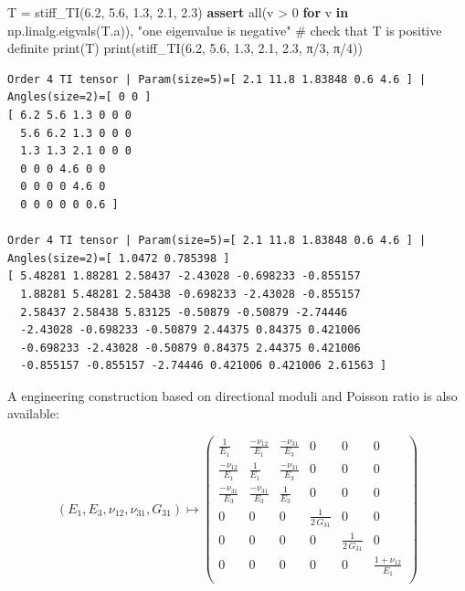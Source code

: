 \documentclass[
  letterpaper,
  DIV=11,
  numbers=noendperiod]{scrreprt}
\newenvironment{Shaded}{\begin{snugshade}}{\end{snugshade}}
\newcommand{\BuiltInTok}[1]{\textcolor[rgb]{0.00,0.23,0.31}{#1}}
\newcommand{\CommentTok}[1]{\textcolor[rgb]{0.37,0.37,0.37}{#1}}
\newcommand{\ControlFlowTok}[1]{\textcolor[rgb]{0.00,0.23,0.31}{\textbf{#1}}}
\newcommand{\DecValTok}[1]{\textcolor[rgb]{0.68,0.00,0.00}{#1}}
\newcommand{\FloatTok}[1]{\textcolor[rgb]{0.68,0.00,0.00}{#1}}
\newcommand{\KeywordTok}[1]{\textcolor[rgb]{0.00,0.23,0.31}{\textbf{#1}}}
\newcommand{\NormalTok}[1]{\textcolor[rgb]{0.00,0.23,0.31}{#1}}
\newcommand{\OperatorTok}[1]{\textcolor[rgb]{0.37,0.37,0.37}{#1}}
\newcommand{\StringTok}[1]{\textcolor[rgb]{0.13,0.47,0.30}{#1}}
\begin{document}
\begin{Shaded}
\begin{Highlighting}[]
\NormalTok{T }\OperatorTok{=}\NormalTok{ stiff\_TI(}\FloatTok{6.2}\NormalTok{, }\FloatTok{5.6}\NormalTok{, }\FloatTok{1.3}\NormalTok{, }\FloatTok{2.1}\NormalTok{, }\FloatTok{2.3}\NormalTok{)}
\ControlFlowTok{assert} \BuiltInTok{all}\NormalTok{(v }\OperatorTok{\textgreater{}} \DecValTok{0} \ControlFlowTok{for}\NormalTok{ v }\KeywordTok{in}\NormalTok{ np.linalg.eigvals(T.a)), }\StringTok{"one eigenvalue is negative"}
\CommentTok{\# check that T is positive definite}
\BuiltInTok{print}\NormalTok{(T)}
\BuiltInTok{print}\NormalTok{(stiff\_TI(}\FloatTok{6.2}\NormalTok{, }\FloatTok{5.6}\NormalTok{, }\FloatTok{1.3}\NormalTok{, }\FloatTok{2.1}\NormalTok{, }\FloatTok{2.3}\NormalTok{, π}\OperatorTok{/}\DecValTok{3}\NormalTok{, π}\OperatorTok{/}\DecValTok{4}\NormalTok{))}
\end{Highlighting}
\end{Shaded}

\begin{verbatim}
Order 4 TI tensor | Param(size=5)=[ 2.1 11.8 1.83848 0.6 4.6 ] | Angles(size=2)=[ 0 0 ]
[ 6.2 5.6 1.3 0 0 0 
  5.6 6.2 1.3 0 0 0 
  1.3 1.3 2.1 0 0 0 
  0 0 0 4.6 0 0 
  0 0 0 0 4.6 0 
  0 0 0 0 0 0.6 ]

Order 4 TI tensor | Param(size=5)=[ 2.1 11.8 1.83848 0.6 4.6 ] | Angles(size=2)=[ 1.0472 0.785398 ]
[ 5.48281 1.88281 2.58437 -2.43028 -0.698233 -0.855157 
  1.88281 5.48281 2.58438 -0.698233 -2.43028 -0.855157 
  2.58437 2.58438 5.83125 -0.50879 -0.50879 -2.74446 
  -2.43028 -0.698233 -0.50879 2.44375 0.84375 0.421006 
  -0.698233 -2.43028 -0.50879 0.84375 2.44375 0.421006 
  -0.855157 -0.855157 -2.74446 0.421006 0.421006 2.61563 ]
\end{verbatim}

A engineering construction based on directional moduli and Poisson ratio
is also available:

\[
(E_1, E_3, \nu_{1 2}, \nu_{3 1}, G_{3 1})
\mapsto
\left(
\begin{array}{cccccc}
\frac{1}{E_1} & \frac{ - \nu_{1 2}}{E_1} & \frac{ - \nu_{3 1}}{E_3} & 0 & 0 & 0 \\
\frac{ - \nu_{1 2}}{E_1} & \frac{1}{E_1} & \frac{ - \nu_{3 1}}{E_3} & 0 & 0 & 0 \\
\frac{ - \nu_{3 1}}{E_3} & \frac{ - \nu_{3 1}}{E_3} & \frac{1}{E_3} & 0 & 0 & 0 \\
0 & 0 & 0 & \frac{1}{2 \, G_{3 1}} & 0 & 0 \\
0 & 0 & 0 & 0 & \frac{1}{2 \, G_{3 1}} & 0 \\
0 & 0 & 0 & 0 & 0 & \frac{1 + \nu_{1 2}}{E_1} \\
\end{array}
\right)
\]
\end{document}

